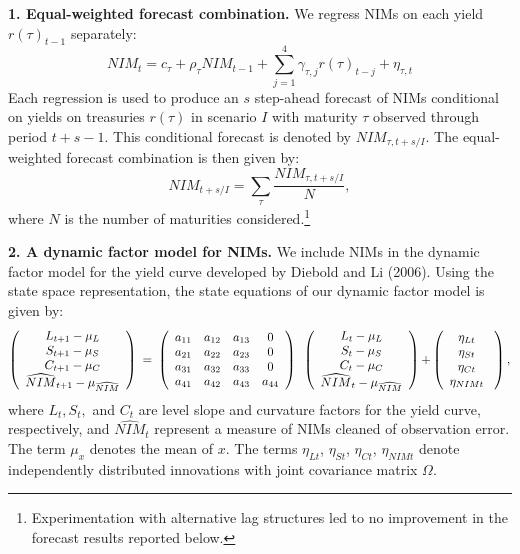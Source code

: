 \documentclass[11pt]{article}
\begin{document}
\vspace{-0.1in}
\noindent \textbf{1. Equal-weighted forecast combination.} We regress NIMs on each yield $r(\tau )_{t-1}$ separately: \
\[
NIM_{t}=c_{\tau }+\rho _{\tau }NIM_{t-1}+\sum_{j=1}^4\gamma _{\tau,j}r(\tau)_{t-j}+{\eta
_{\tau ,t}}
\]
Each regression is used to produce an $s$ step-ahead forecast of NIMs conditional on yields on treasuries $r(\tau)$ in scenario $I$ with maturity $\tau$ observed through period $t+s-1.$ This conditional forecast is denoted by $NIM_{\tau,t+s/I}.$ The equal-weighted forecast combination is then given by:
\[
NIM_{t+s/I}=\sum_{\tau }\frac{NIM_{\tau ,t+s/I}}{N},
\]
where $N$ is the number of maturities considered.\footnote{Experimentation with alternative lag structures led to no improvement in the forecast results reported below.}

\noindent \textbf{2. A dynamic factor model for NIMs.} We include NIMs in the dynamic factor model for the yield curve developed by Diebold and Li (2006). Using the state space representation, the state equations of our dynamic factor model is given by:
\[
\left(
\begin{array}{c}
{L_{t+1}-\mu _{L}} \\
{S_{t+1}-\mu _{S}} \\
{C_{t+1}-\mu _{C}} \\
\widehat{NIM}_{t+1}-\mu _{\widehat{NIM}}%
\end{array}%
\right) {\normalsize \ =\ }\left(
\begin{array}{cccc}
a_{11} & a_{12} & a_{13} & 0 \\
a_{21} & a_{22} & a_{23} & 0 \\
a_{31} & a_{32} & a_{33} & 0 \\
a_{41} & a_{42} & a_{43} & a_{44}%
\end{array}%
\right) {\normalsize \ }\left(
\begin{array}{c}
{L_{t}-\mu _{L}} \\
{S_{t}-\mu _{S}} \\
{C_{t}-\mu _{C}} \\
\widehat{NIM}_{t}-\mu _{\widehat{NIM}}%
\end{array}%
\right) {\normalsize +}\left(
\begin{array}{c}
{\eta _{Lt}} \\
{\eta _{St}} \\
{\eta _{Ct}} \\
{\eta _{NIMt}}%
\end{array}%
{\normalsize \ }\right) ,
\]
where $L_{t},S_{t},$ and $C_{t}$ are level slope and curvature factors for the yield curve, respectively, and $\widehat{NIM}_{t}$ represent a measure of NIMs cleaned of observation error. The term $\mu _{x}$ denotes the mean of $x$. The terms ${\eta _{Lt}}$, ${\eta _{St}}$, ${\eta _{Ct}}$, ${\eta_{NIMt}}$ denote independently distributed innovations with joint covariance matrix $\Omega $.
\end{document}
